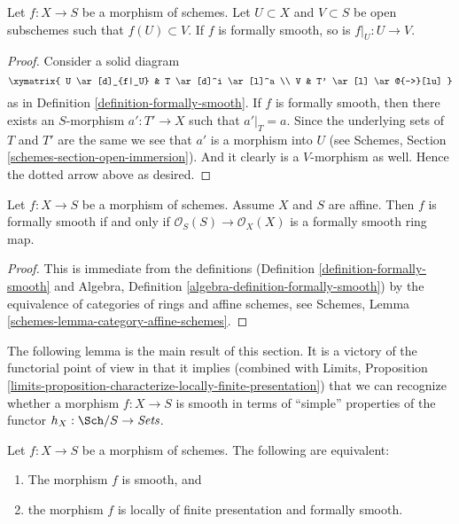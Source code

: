 \begin{lemma}
\label{lemma-formally-smooth-on-opens}
Let $f : X \to S$ be a morphism of schemes.
Let $U \subset X$ and $V \subset S$ be open subschemes such that
$f(U) \subset V$. If $f$ is formally smooth, so is $f|_U : U \to V$.
\end{lemma}

\begin{proof}
Consider a solid diagram
$$
\xymatrix{
U \ar[d]_{f|_U} & T \ar[d]^i \ar[l]^a \\
V & T' \ar[l] \ar@{-->}[lu]
}
$$
as in Definition \ref{definition-formally-smooth}. If $f$ is formally
smooth, then there exists an $S$-morphism $a' : T' \to X$ such that
$a'|_T = a$. Since the underlying sets of $T$ and $T'$ are the same
we see that $a'$ is a morphism into $U$ (see Schemes, Section
\ref{schemes-section-open-immersion}). And it clearly is a $V$-morphism
as well. Hence the dotted arrow above as desired.
\end{proof}

\begin{lemma}
\label{lemma-affine-formally-smooth}
Let $f : X \to S$ be a morphism of schemes.
Assume $X$ and $S$ are affine.
Then $f$ is formally smooth if and only if
$\mathcal{O}_S(S) \to \mathcal{O}_X(X)$ is a formally smooth
ring map.
\end{lemma}

\begin{proof}
This is immediate from the definitions
(Definition \ref{definition-formally-smooth} and
Algebra, Definition \ref{algebra-definition-formally-smooth})
by the equivalence of categories of rings and affine schemes,
see
Schemes, Lemma \ref{schemes-lemma-category-affine-schemes}.
\end{proof}

\noindent
The following lemma is the main result of this section. It is a victory of the
functorial point of view in that it implies (combined with
Limits,
Proposition \ref{limits-proposition-characterize-locally-finite-presentation})
that we can recognize whether a morphism $f : X \to S$ is smooth in terms of
``simple'' properties of the functor $h_X : \Sch/S \to \textit{Sets}$.

\begin{lemma}
\label{lemma-smooth-formally-smooth}
Let $f : X \to S$ be a morphism of schemes.
The following are equivalent:
\begin{enumerate}
\item The morphism $f$ is smooth, and
\item the morphism $f$ is locally of finite presentation and
formally smooth.
\end{enumerate}
\end{lemma}

